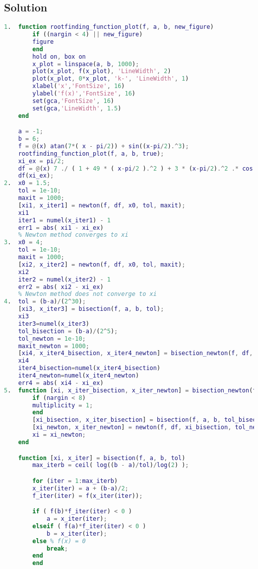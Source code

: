 \documentclass[12pt, a4paper]{report}
\begin{document}
    \subsection*{Solution}
        \begin{lstlisting}[language=Matlab]
1.  function rootfinding_function_plot(f, a, b, new_figure)
        if ((nargin < 4) || new_figure)
        figure
        end
        hold on, box on
        x_plot = linspace(a, b, 1000);
        plot(x_plot, f(x_plot), 'LineWidth', 2)
        plot(x_plot, 0*x_plot, 'k-', 'LineWidth', 1)
        xlabel('x','FontSize', 16)
        ylabel('f(x)','FontSize', 16)
        set(gca,'FontSize', 16)
        set(gca,'LineWidth', 1.5)
    end

    a = -1;
    b = 6;
    f = @(x) atan(7*( x - pi/2)) + sin((x-pi/2).^3);
    rootfinding_function_plot(f, a, b, true);
    xi_ex = pi/2;
    df = @(x) 7 ./ ( 1 + 49 * ( x-pi/2 ).^2 ) + 3 * (x-pi/2).^2 .* cos( (x-pi/2).^3 );
    df(xi_ex); 
2.  x0 = 1.5;
    tol = 1e-10;
    maxit = 1000;
    [xi1, x_iter1] = newton(f, df, x0, tol, maxit);
    xi1
    iter1 = numel(x_iter1) - 1
    err1 = abs( xi1 - xi_ex)
    % Newton method converges to xi
3.  x0 = 4;
    tol = 1e-10;
    maxit = 1000;
    [xi2, x_iter2] = newton(f, df, x0, tol, maxit);
    xi2
    iter2 = numel(x_iter2) - 1
    err2 = abs( xi2 - xi_ex)
    % Newton method does not converge to xi
4.  tol = (b-a)/(2^30);
    [xi3, x_iter3] = bisection(f, a, b, tol);
    xi3
    iter3=numel(x_iter3)  
    tol_bisection = (b-a)/(2^5);
    tol_newton = 1e-10;
    maxit_newton = 1000;
    [xi4, x_iter4_bisection, x_iter4_newton] = bisection_newton(f, df, a, b, tol_bisection, tol_newton, maxit_newton);
    xi4
    iter4_bisection=numel(x_iter4_bisection)
    iter4_newton=numel(x_iter4_newton)
    err4 = abs( xi4 - xi_ex)
5.  function [xi, x_iter_bisection, x_iter_newton] = bisection_newton(f, df, a, b, tol_bisection, tol_newton, maxit_newton, multiplicity)
        if (nargin < 8)
        multiplicity = 1;
        end
        [xi_bisection, x_iter_bisection] = bisection(f, a, b, tol_bisection);
        [xi_newton, x_iter_newton] = newton(f, df, xi_bisection, tol_newton, maxit_newton, multiplicity);
        xi = xi_newton;
    end

    function [xi, x_iter] = bisection(f, a, b, tol)
        max_iterb = ceil( log((b - a)/tol)/log(2) );

        for (iter = 1:max_iterb)
        x_iter(iter) = a + (b-a)/2;
        f_iter(iter) = f(x_iter(iter));

        if ( f(b)*f_iter(iter) < 0 )
            a = x_iter(iter);
        elseif ( f(a)*f_iter(iter) < 0 )
            b = x_iter(iter);
        else % f(x) = 0
            break;
        end
        end


\end{lstlisting}
\end{document}
